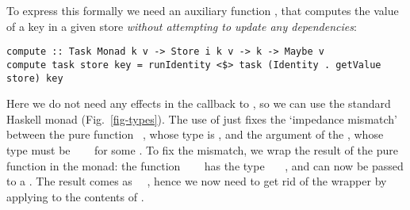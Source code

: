 To express this formally we need an auxiliary function , that
computes the value of a key in a given store \emph{without attempting to update
any dependencies}:
\begin{verbatim}
compute :: Task Monad k v -> Store i k v -> k -> Maybe v
compute task store key = runIdentity <$> task (Identity . getValue store) key
\end{verbatim}

\noindent
Here we do not need any effects in the  callback to , so
we can use the standard Haskell  monad (Fig.~\ref{fig-types}).
The use of  just fixes the `impedance mismatch' between the pure
function ~, whose type is \store, and the 
argument of the , whose type must be ~\hs{->}~~ for
some . To fix the mismatch, we wrap the result of the pure function in the
 monad: the function ~~~
has the type ~\hs{->}~~, and can now be passed to a
. The result comes as ~~, hence we now
need to get rid of the  wrapper by applying  to the
contents of .

